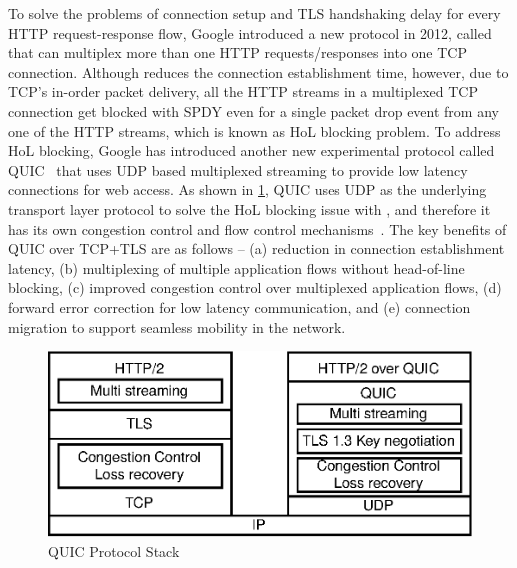 To solve the problems of connection setup and \ac{TLS} handshaking delay for every \ac{HTTP} request-response flow, Google introduced a new protocol in 2012, called  ~\cite{SPDYingupweb,Erman} that can multiplex more than one \ac{HTTP} requests/responses into one \ac{TCP} connection. Although  reduces the connection establishment time, however, due to \ac{TCP}'s in-order packet delivery, all the \ac{HTTP} streams in a multiplexed \ac{TCP} connection get blocked with \ac{SPDY} even for a single packet drop event from any one of the \ac{HTTP} streams, which is known as \ac{HoL} blocking problem. To address \ac{HoL} blocking, Google has introduced another new experimental protocol called \ac{QUIC}~\cite{roskind2015quic,Cui2017,Megyesi2016} that uses \ac{UDP} based multiplexed streaming to provide low latency connections for web access. As shown in \fig\ref{fig:quic-protocolstack}, \ac{QUIC} uses \ac{UDP} as the underlying transport layer protocol to solve the \ac{HoL} blocking issue with , and therefore it has its own congestion control and flow control mechanisms~\cite{Cui2017,roskind2015quic}. The key benefits of \ac{QUIC} over \ac{TCP}+\ac{TLS} are as follows -- (a) reduction in connection establishment latency, (b) multiplexing of multiple application flows without head-of-line blocking, (c) improved congestion control over multiplexed application flows, (d) forward error correction for low latency communication, and (e) connection migration to support seamless mobility in the network.

\begin{figure}[!t]
	\centering
	\includegraphics[width=0.7\linewidth]{img/quic-protocolstack}
	\caption{\acs{QUIC} Protocol Stack}
	\label{fig:quic-protocolstack}
\end{figure}

